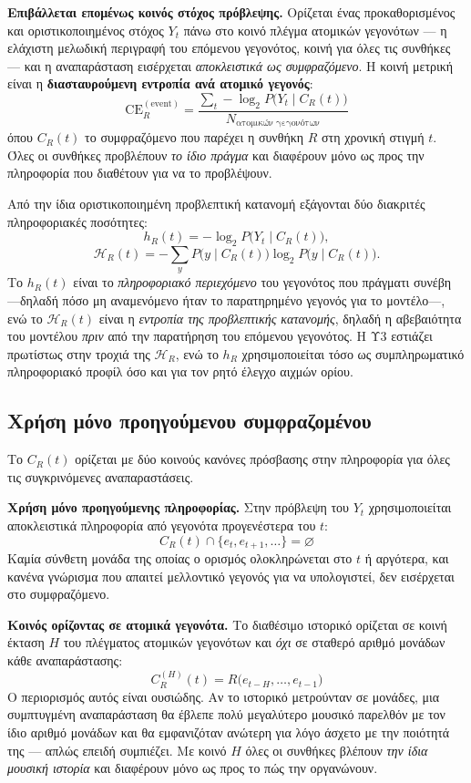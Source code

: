 \documentclass[11pt,a4paper]{article}
\begin{document}
\textbf{Επιβάλλεται επομένως κοινός στόχος πρόβλεψης.} Ορίζεται ένας προκαθορισμένος και οριστικοποιημένος στόχος \(Y_t\) πάνω στο κοινό πλέγμα ατομικών γεγονότων --- η ελάχιστη μελωδική περιγραφή του επόμενου γεγονότος, κοινή για όλες τις συνθήκες --- και η αναπαράσταση εισέρχεται \emph{αποκλειστικά ως συμφραζόμενο}. Η κοινή μετρική είναι η \textbf{διασταυρούμενη εντροπία ανά ατομικό γεγονός}:
\[
\mathrm{CE}^{(\mathrm{event})}_R=\frac{\sum_t -\log_2 P\bigl(Y_t \mid C_R(t)\bigr)}{N_{\text{ατομικών γεγονότων}}}
\]
όπου \(C_R(t)\) το συμφραζόμενο που παρέχει η συνθήκη \(R\) στη χρονική στιγμή \(t\). Όλες οι συνθήκες προβλέπουν \emph{το ίδιο πράγμα} και διαφέρουν μόνο ως προς την πληροφορία που διαθέτουν για να το προβλέψουν.

Από την ίδια οριστικοποιημένη προβλεπτική κατανομή εξάγονται δύο διακριτές πληροφοριακές ποσότητες:
\[
h_R(t)=-\log_2 P\bigl(Y_t\mid C_R(t)\bigr),
\]
\[
\mathcal{H}_R(t)=-\sum_y P\bigl(y\mid C_R(t)\bigr)\log_2 P\bigl(y\mid C_R(t)\bigr).
\]
Το \(h_R(t)\) είναι το \emph{πληροφοριακό περιεχόμενο} του γεγονότος που πράγματι συνέβη —δηλαδή πόσο μη αναμενόμενο ήταν το παρατηρημένο γεγονός για το μοντέλο—, ενώ το \(\mathcal{H}_R(t)\) είναι η \emph{εντροπία της προβλεπτικής κατανομής}, δηλαδή η αβεβαιότητα του μοντέλου \emph{πριν} από την παρατήρηση του επόμενου γεγονότος. Η Υ3 εστιάζει πρωτίστως στην τροχιά της \(\mathcal{H}_R\), ενώ το \(h_R\) χρησιμοποιείται τόσο ως συμπληρωματικό πληροφοριακό προφίλ όσο και για τον ρητό έλεγχο αιχμών ορίου.

\subsection{Χρήση μόνο προηγούμενου συμφραζομένου}\label{app:repr-past-only}

Το \(C_R(t)\) ορίζεται με δύο κοινούς κανόνες πρόσβασης στην πληροφορία για όλες τις συγκρινόμενες αναπαραστάσεις.

\textbf{Χρήση μόνο προηγούμενης πληροφορίας.} Στην πρόβλεψη του \(Y_t\) χρησιμοποιείται αποκλειστικά πληροφορία από γεγονότα προγενέστερα του \(t\):
\[
C_R(t)\cap\{e_t,e_{t+1},\dots\}=\varnothing
\]
Καμία σύνθετη μονάδα της οποίας ο ορισμός ολοκληρώνεται στο \(t\) ή αργότερα, και κανένα γνώρισμα που απαιτεί μελλοντικό γεγονός για να υπολογιστεί, δεν εισέρχεται στο συμφραζόμενο.

\textbf{Κοινός ορίζοντας σε ατομικά γεγονότα.} Το διαθέσιμο ιστορικό ορίζεται σε κοινή έκταση \(H\) του πλέγματος ατομικών γεγονότων και \emph{όχι} σε σταθερό αριθμό μονάδων κάθε αναπαράστασης:
\[
C_R^{(H)}(t)=R\bigl(e_{t-H},\dots,e_{t-1}\bigr)
\]
Ο περιορισμός αυτός είναι ουσιώδης. Αν το ιστορικό μετρούνταν σε μονάδες, μια συμπτυγμένη αναπαράσταση θα έβλεπε πολύ μεγαλύτερο μουσικό παρελθόν με τον ίδιο αριθμό μονάδων και θα εμφανιζόταν ανώτερη για λόγο άσχετο με την ποιότητά της --- απλώς επειδή συμπιέζει. Με κοινό \(H\) όλες οι συνθήκες βλέπουν \emph{την ίδια μουσική ιστορία} και διαφέρουν μόνο ως προς το πώς την οργανώνουν.
\end{document}
